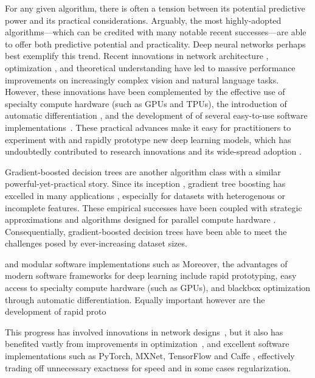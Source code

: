 For any given algorithm, there is often a tension between its potential predictive power and its practical considerations.
Arguably, the most highly-adopted algorithms---which can be credited with many notable recent successes---are able to offer both predictive potential and practicality.
Deep neural networks perhaps best exemplify this trend.
Recent innovations in
network architecture \citep[e.g.][]{krizhevsky2012imagenet,he2016deep,vaswani2017attention,devlin2018bert,huang2019convolutional},
optimization \citep[e.g.][]{hochreiter1997flat,bottou2010large,ioffe2015batch,izmailov2018averaging},
and theoretical understanding \citep[e.g.][]{keskar2016large,zhang2016understanding,}
have led to massive performance improvements on increasingly complex vision and natural language tasks.
However, these innovations have been complemented by
the effective use of specialty compute hardware (such as GPUs and TPUs),
the introduction of automatic differentiation \citep[e.g.][]{paszke2017automatic},
and the development of of several easy-to-use software implementations~\citep[e.g.][]{jia2014caffe,chen2015mxnet,abadi2016tensorflow,paszke2019pytorch}.
These practical advances make it easy for practitioners to experiment with and rapidly prototype new deep learning models, which has undoubtedly contributed to research innovations and its wide-spread adoption \cite{goodfellow2016deep}.

Gradient-boosted decision trees are another algorithm class with a similar powerful-yet-practical story.
Since its inception \cite{friedman2001greedy,friedman2002stochastic}, gradient tree boosting has excelled in many applications \citep[e.g.][]{richardson2007predicting,burges2010ranknet,li2010robust}, especially for datasets with heterogenous or incomplete features.
These empirical successes have been coupled with strategic approximations and algorithms designed for parallel compute hardware \citep[e.g.][]{panda2009planet,tyree2011parallel,chen2015mxnet,ke2017lightgbm}.
Consequentially, gradient-boosted decision trees have been able to meet the challenges posed by ever-increasing dataset sizes.

and modular software implementations such as
Moreover, the advantages of modern software frameworks for deep learning include rapid prototyping, easy access to specialty compute hardware (such as GPUs), and blackbox optimization through automatic differentiation.
Equally important however are the development of
rapid proto


This progress has involved innovations in network designs~,
but it also has benefited vastly from improvements in optimization~\cite{bottou2010large},
and excellent software implementations such as PyTorch, MXNet, TensorFlow and Caffe
\citep{bottou2010large, krizhevsky2012imagenet, chaudhari2016entropy, hochreiter1997flat, keskar2016large, izmailov2018averaging}, effectively trading off unnecessary exactness for speed and in some cases regularization.

